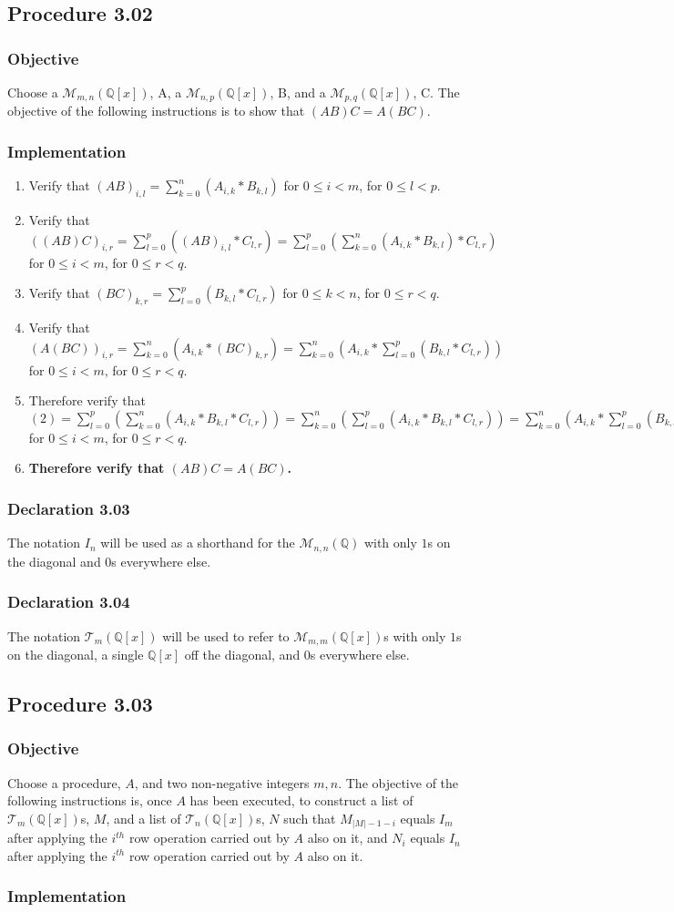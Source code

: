 \documentclass[twocolumn]{article}
\newcommand{\declaration}[1]{\subsubsection*{Declaration #1}\label{sec:declaration #1}}
\newcommand{\procedure}[2][]{\subsection*{Procedure #2 \ifthenelse{\equal{#1}{}}{}{(#1)}}\label{sec:procedure #2}}
\newcommand{\objective}{\subsubsection*{Objective}}
\newcommand{\implementation}{\subsubsection*{Implementation}}
\begin{document}
		\procedure{3.02}
			\objective
				Choose a $\mathcal{M}_{m,n}(\mathbb{Q}[x])$, A, a $\mathcal{M}_{n,p}(\mathbb{Q}[x])$, B, and a $\mathcal{M}_{p,q}(\mathbb{Q}[x])$, C. The objective of the following instructions is to show that $(AB)C=A(BC)$.
			\implementation
				\begin{enumerate}
					\item Verify that $(AB)_{i,l}=\sum_{k=0}^{n} \left(A_{i,k}*B_{k,l}\right)$ for $0\le i<m$, for $0\le l<p$.
					\item Verify that $((AB)C)_{i,r}=\sum_{l=0}^{p} \left((AB)_{i,l}*C_{l,r}\right)=\sum_{l=0}^{p} \left(\sum_{k=0}^{n} \left(A_{i,k}*B_{k,l}\right)*C_{l,r}\right)$ for $0\le i<m$, for $0\le r<q$.
					\item Verify that $(BC)_{k,r}=\sum_{l=0}^{p}\left(B_{k,l}*C_{l,r}\right)$ for $0\le k<n$, for $0\le r<q$.
					\item Verify that $(A(BC))_{i,r}=\sum_{k=0}^{n}\left(A_{i,k}*(BC)_{k,r}\right)=\sum_{k=0}^{n}\left(A_{i,k}*\sum_{l=0}^{p}\left(B_{k,l}*C_{l,r}\right)\right)$ for $0\le i<m$, for $0\le r<q$.
					\item Therefore verify that $(2)=\sum_{l=0}^{p} \left(\sum_{k=0}^{n} \left(A_{i,k}*B_{k,l}*C_{l,r}\right)\right)=\sum_{k=0}^{n} \left(\sum_{l=0}^{p} \left(A_{i,k}*B_{k,l}*C_{l,r}\right)\right)=\sum_{k=0}^{n}\left(A_{i,k}*\sum_{l=0}^{p}\left(B_{k,l}*C_{l,r}\right)\right)=(4)$ for $0\le i<m$, for $0\le r<q$.
					\item \textbf{Therefore verify that $(AB)C=A(BC)$.}
				\end{enumerate}
		\declaration{3.03}
			The notation $I_n$ will be used as a shorthand for the $\mathcal{M}_{n,n}(\mathbb{Q})$ with only $1$s on the diagonal and $0$s everywhere else.
		\declaration{3.04}
			The notation $\mathcal{T}_{m}(\mathbb{Q}[x])$ will be used to refer to $\mathcal{M}_{m,m}(\mathbb{Q}[x])$s with only $1$s on the diagonal, a single $\mathbb{Q}[x]$ off the diagonal, and $0$s everywhere else.
		\procedure{3.03}
			\objective
				Choose a procedure, $A$, and two non-negative integers $m,n$. The objective of the following instructions is, once $A$ has been executed, to construct a list of $\mathcal{T}_{m}(\mathbb{Q}[x])$s, $M$, and a list of $\mathcal{T}_{n}(\mathbb{Q}[x])$s, $N$ such that $M_{\lvert M\rvert-1-i}$ equals $I_m$ after applying the $i^{th}$ row operation carried out by $A$ also on it, and $N_i$ equals $I_n$ after applying the $i^{th}$ row operation carried out by $A$ also on it.
			\implementation
\end{document}
